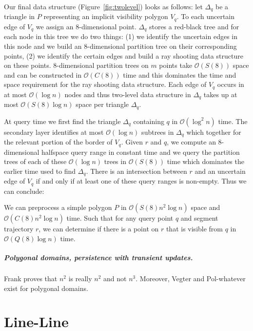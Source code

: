 \documentclass[a4paper, UKenglish]{lipics-v2018}
\begin{document}
Our final data structure (Figure~\ref{fig:twolevel}) looks as follows: let $\Delta_q$ be a triangle in $P$ representing an implicit visibility polygon $V_q$. To each uncertain edge of $V_q$ we assign an $8$-dimensional point. $\Delta_q$ stores a red-black tree and for each node in this tree we do two things: (1) we identify the uncertain edges in this node and we build an $8$-dimensional partition tree on their corresponding points, (2) we identify the certain edges and build a ray shooting data structure on these points.
$8$-dimensional partition trees on $m$ points take $\mathcal{O}(S(8))$ space and can be constructed in $\mathcal{O}(C(8))$ time and this dominates the time and space requirement for the ray shooting data structure. Each edge of $V_q$ occurs in at most $\mathcal{O}(\log n)$ nodes and thus two-level data structure in $\Delta_q$ takes up at most $\mathcal{O}(S(8) \log n)$ space per triangle $\Delta_q$.

At query time we first find the triangle $\Delta_q$ containing $q$ in $\mathcal{O}(\log^2 n)$ time. The secondary layer identifies at most $\mathcal{O}(\log n)$ subtrees in $\Delta_q$ which together for the relevant portion of the border of $V_q$. Given $r$ and $q$, we compute an $8$-dimensional halfspace query range in constant time and we query the partition trees of each of these $\mathcal{O}(\log n)$ trees in $\mathcal{O}(S(8))$ time which dominates the earlier time used to find $\Delta_q$. There is an intersection between $r$ and an uncertain edge of $V_q$ if and only if at least one of these query ranges is non-empty.  Thus we can conclude:

\begin{theorem}
We can preprocess a simple polygon $P$ in $\mathcal{O}(S(8) n^2 \log n)$ space and $\mathcal{O}(C(8) n^2 \log n)$ time. Such that for any query point $q$ and segment trajectory $r$, we can determine if there is a point on $r$ that is visible from $q$ in $\mathcal{O}(Q(8) \log n)$ time.
\end{theorem}




\subparagraph{Polygonal domains, persistence with transient updates.}

Frank proves that $n^2$ is really $n^2$ and not $n^3$. Moreover, Vegter and Pol-whatever exist for polygonal domains.


\section{Line-Line}
\label{sec:lineline}
\end{document}
